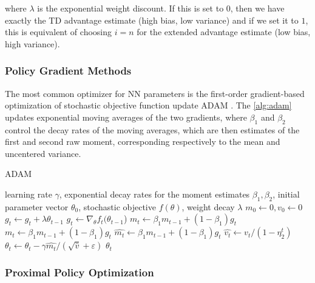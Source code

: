 where $\lambda$ is the exponential weight discount. If this is set to $0$, then we have exactly the \ac{TD} advantage estimate (high bias, low variance) and if we set it to $1$, this is equivalent of choosing $i=n$ for the extended advantage estimate (low bias, high variance).

\subsubsection{Policy Gradient Methods}

The most common optimizer for \ac{NN} parameters is the first-order gradient-based optimization of stochastic objective function update ADAM \cite{kingma_adam_2017}. The \cref{alg:adam}
updates exponential moving averages of the two gradients, where $\beta_1$ and $\beta_2$ control the decay rates of the moving averages, which are then estimates of the first and second raw moment, corresponding respectively to the mean and uncentered variance.

\begin{algorithm}[H]
    \caption{ADAM}
    \label{alg:adam}
    \begin{algorithmic}[1]
        \REQUIRE learning rate $\gamma$, exponential decay rates for the moment estimates $\beta_1, \beta_2$, initial parameter vector $\theta_0$, stochastic objective $f(\theta)$, weight decay $\lambda$
        \REQUIRE $m_0 \leftarrow 0, v_0 \leftarrow 0$
        \STATE $g_t \leftarrow g_t + \lambda\theta_{t-1}$
        \ENDIF
        \STATE $g_t \leftarrow \nabla _{\theta} f_t (\theta_{t-1}$)
        \STATE $m_t \leftarrow \beta_1 m_{t-1} + (1-\beta_1)g_t$
        \STATE $m_t \leftarrow \beta_1 m_{t-1} + (1-\beta_1)g_t$
        \STATE $\hat{m_t} \leftarrow \beta_1 m_{t-1} + (1-\beta_1)g_t$
        \STATE $\hat{v_t} \leftarrow v_t / (1-\eta_2 ^t)$
        \STATE $\theta_t \leftarrow \theta_t - \gamma \hat{m_t} / (\sqrt{\hat{v}} + \varepsilon)$
        \ENDFOR
        \RETURN $\theta_t$
    \end{algorithmic}
\end{algorithm}

\subsubsection{Proximal Policy Optimization}

